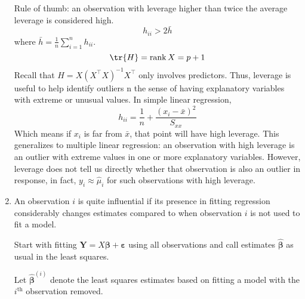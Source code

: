 \begin{enumerate}[(1)]
          Rule of thumb: an observation with leverage higher than twice the average
          leverage is considered high.
          \[ h_{ii}>2\bar{h} \]
          where $ \bar{h}=\frac{1}{n} \sum_{i=1}^{n} h_{ii} $.
          \[ \tr{H}=\rank{X}=p+1 \]
          Recall that $ H=X(X^\top X)^{-1}X^\top $
          only involves predictors. Thus, leverage is useful
          to help identify outliers n the sense of having explanatory
          variables with extreme or unusual values. In simple
          linear regression,
          \[ h_{ii}=\frac{1}{n} +\frac{(x_i-\bar{x})^2}{S_{xx}} \]
          Which means if $ x_i $ is far from $ \bar{x} $,
          that point will have high leverage. This generalizes
          to multiple linear regression: an observation
          with high leverage is an outlier with extreme values in one
          or more explanatory variables. However, leverage does not
          tell us directly whether that observation is also
          an outlier in response, in fact, $ y_i\approx \hat{\mu}_i $
          for such observations with high leverage.
    \item An observation $ i $ is quite influential if its presence
          in fitting regression considerably changes estimates compared to when
          observation $ i $ is not used to fit a model.

          Start with fitting $ \symbf{Y}=X\symbf{\beta}+\symbf{\varepsilon} $
          using all observations and call estimates $ \hat{\symbf{\beta}} $
          as usual in the least squares.

          Let $ \hat{\symbf{\beta}}^{(i)} $ denote the least squares estimates
          based on fitting a model with the $ i^{\text{th}} $
          observation removed.


\end{enumerate}
